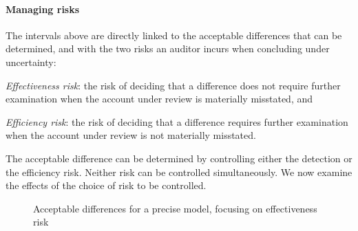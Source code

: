 \paragraph{Managing risks} The intervals above are directly linked to the acceptable differences that can be determined, and with the two risks an auditor incurs when concluding under uncertainty:

\begin{compactitem}
\item \textit{Effectiveness risk}: the risk of deciding that a difference does not require further examination when the account under review is materially misstated, and 
\item \textit{Efficiency risk}: the risk of deciding that a difference requires further examination when the account under review is not materially misstated.
\end{compactitem}

\bigskip
The acceptable difference can be determined by controlling either the detection or the efficiency risk. Neither risk can be controlled simultaneously. We now examine the effects of the choice of risk to be controlled.

\begin{figure}[thbp]
\begin{center}
\caption{Acceptable differences for a precise model, focusing on effec\-tiveness risk}

\label{fig:method_detection_precise}
\end{center}
\end{figure}


